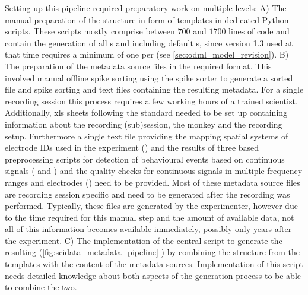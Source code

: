 Setting up this pipeline required preparatory work on multiple levels:
A) The manual preparation of the  structure in form of  templates in dedicated Python scripts. These scripts mostly comprise between $700$ and $1700$ lines of code and contain the generation of all  s and  including default s, since  version 1.3 used at that time requires a minimum of one  per  (see \cref{sec:odml_model_revision}). 
B) The preparation of the metadata source files in the required format. This involved manual offline spike sorting using the  spike sorter to generate a sorted  file and spike sorting  and text files containing the resulting metadata. For a single recording session this process requires a few working hours of a trained scientist. Additionally, xls sheets following the  standard needed to be set up containing information about the recording (sub)session, the monkey and the recording setup. Furthermore a single text file providing the mapping spatial systems of electrode IDs used in the experiment () and the results of three  based preprocessing scripts for detection of behavioural events based on continuous signals ( and ) and the quality checks for continuous signals in multiple frequency ranges and electrodes () need to be provided. Most of these metadata source files are recording session specific and need to be generated after the recording was performed. Typically, these files are generated by the experimenter, however due to the time required for this manual step and the amount of available data, not all of this information becomes available immediately, possibly only years after the experiment.
C) The implementation of the central script to generate the resulting   (\cref{fig:scidata_metadata_pipeline} ) by combining the  structure from the templates with the content of the metadata sources. Implementation of this script needs detailed knowledge about both aspects of the  generation process to be able to combine the two.



